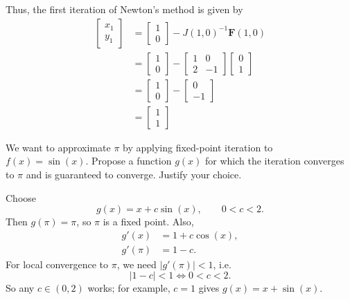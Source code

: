 \documentclass[reqno]{exam}
\begin{document}
\begin{questions}
\begin{solution}
    Thus, the first iteration of Newton's method is given by
    \begin{align*}
      \begin{bmatrix} x_1 \\ y_1 \end{bmatrix} & = \begin{bmatrix} 1 \\ 0 \end{bmatrix} - J(1, 0)^{-1} \mathbf{F}(1, 0)                                                      \\
                                               & = \begin{bmatrix} 1 \\ 0 \end{bmatrix} - \begin{bmatrix} 1 & 0 \\ 2 & -1 \end{bmatrix} \begin{bmatrix} 0 \\ 1 \end{bmatrix} \\
                                               & = \begin{bmatrix} 1 \\ 0 \end{bmatrix} - \begin{bmatrix} 0 \\ -1 \end{bmatrix}                                              \\
                                               & = \begin{bmatrix} 1 \\ 1 \end{bmatrix}
    \end{align*}
  \end{solution}




  \newpage

  \question[5] We want to approximate $\pi$ by applying fixed-point iteration to $f(x)=\sin(x)$. Propose a function $g(x)$ for which the iteration converges to $\pi$ and is guaranteed to converge. Justify your choice.

  \begin{solution}
    Choose
    \[
      g(x)=x+c\sin(x),\qquad 0<c<2.
    \]
    Then $g(\pi)=\pi$, so $\pi$ is a fixed point. Also,
    \begin{align*}
      g'(x)   & = 1+c\cos(x), \\
      g'(\pi) & = 1-c.
    \end{align*}
    For local convergence to $\pi$, we need $|g'(\pi)|<1$, i.e.
    \[
      |1-c|<1 \iff 0<c<2.
    \]
    So any $c\in(0,2)$ works; for example, $c=1$ gives $g(x)=x+\sin(x)$.
  \end{solution}
  \vfill


\end{questions}
\end{document}
